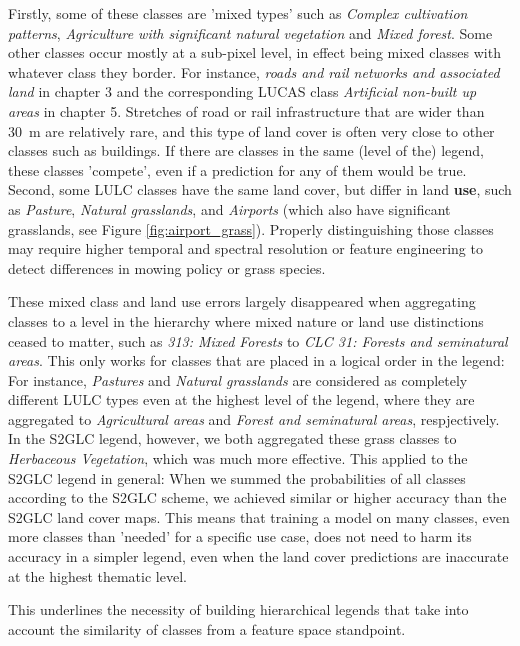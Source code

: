        Firstly, some of these classes are 'mixed types' such as \textit{Complex cultivation patterns}, \textit{Agriculture with significant natural vegetation} and \textit{Mixed forest}. Some other classes occur mostly at a sub-pixel level, in effect being mixed classes with whatever class they border. For instance, \textit{roads and rail networks and associated land} in chapter 3 and the corresponding LUCAS class \textit{Artificial non-built up areas} in chapter 5. Stretches of road or rail infrastructure that are wider than 30~m are relatively rare, and this type of land cover is often very close to other classes such as buildings. If there are classes in the same (level of the) legend, these classes 'compete', even if a prediction for any of them would be true. Second, some LULC classes have the same land cover, but differ in land \textbf{use}, such as \textit{Pasture}, \textit{Natural grasslands}, and \textit{Airports} (which also have significant grasslands, see Figure \ref{fig:airport_grass}). Properly distinguishing those classes may require higher temporal and spectral resolution or feature engineering to detect differences in mowing policy or grass species. 
        
        These mixed class and land use errors largely disappeared when aggregating classes to a level in the hierarchy where mixed nature or land use distinctions ceased to matter, such as \textit{313: Mixed Forests} to \textit{CLC 31: Forests and seminatural areas}. This only works for classes that are placed in a logical order in the legend: For instance, \textit{Pastures} and \textit{Natural grasslands} are considered as completely different LULC types even at the highest level of the legend, where they are aggregated to \textit{Agricultural areas} and \textit{Forest and seminatural areas}, respjectively. In the S2GLC legend, however, we both aggregated these grass classes to \textit{Herbaceous Vegetation}, which was much more effective. This applied to the S2GLC legend in general: When we summed the probabilities of all classes according to the S2GLC scheme, we achieved similar or higher accuracy than the S2GLC land cover maps. This means that training a model on many classes, even more classes than 'needed' for a specific use case, does not need to harm its accuracy in a simpler legend, even when the land cover predictions are inaccurate at the highest thematic level.

        This underlines the necessity of building hierarchical legends that take into account the similarity of classes from a feature space standpoint.
    
